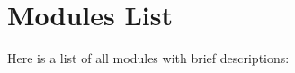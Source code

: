 \section{Modules List}
Here is a list of all modules with brief descriptions\-:\begin{DoxyCompactList}
\item{}
\end{DoxyCompactList}
